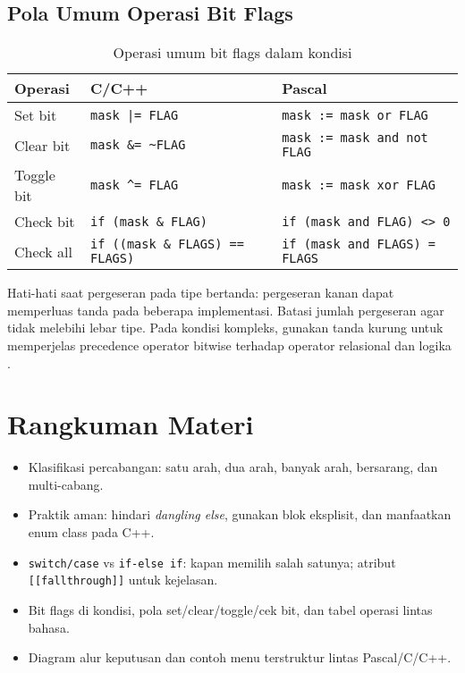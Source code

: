 \documentclass[../main.tex]{subfiles}
\begin{document}
\subsection{Pola Umum Operasi Bit Flags}
\begin{table}[H]
  \centering
  \caption{Operasi umum bit flags dalam kondisi}
  \begin{tabular}{@{}lll@{}}
    \toprule
    Operasi & C/C++ & Pascal \\
    \midrule
    Set bit & \texttt{mask |= FLAG} & \texttt{mask := mask or FLAG} \\
    Clear bit & \texttt{mask \&= \~{}FLAG} & \texttt{mask := mask and not FLAG} \\
    Toggle bit & \texttt{mask \^{}= FLAG} & \texttt{mask := mask xor FLAG} \\
    Check bit & \texttt{if (mask \& FLAG)} & \texttt{if (mask and FLAG) {\textless}{\textgreater} 0} \\
    Check all & \texttt{if ((mask \& FLAGS) == FLAGS)} & \texttt{if (mask and FLAGS) = FLAGS} \\
    \bottomrule
  \end{tabular}
\end{table}

Hati-hati saat pergeseran pada tipe bertanda: pergeseran kanan dapat memperluas tanda pada beberapa implementasi. Batasi jumlah pergeseran agar tidak melebihi lebar tipe. Pada kondisi kompleks, gunakan tanda kurung untuk memperjelas precedence operator bitwise terhadap operator relasional dan logika \parencite{iso-c-draft-n1570,cpp-reference}.

\section{Rangkuman Materi}
\begin{itemize}
  \item Klasifikasi percabangan: satu arah, dua arah, banyak arah, bersarang, dan multi-cabang.
  \item Praktik aman: hindari \emph{dangling else}, gunakan blok eksplisit, dan manfaatkan enum class pada C++.
  \item \texttt{switch/case} vs \texttt{if-else if}: kapan memilih salah satunya; atribut \texttt{[[fallthrough]]} untuk kejelasan.
  \item Bit flags di kondisi, pola set/clear/toggle/cek bit, dan tabel operasi lintas bahasa.
  \item Diagram alur keputusan dan contoh menu terstruktur lintas Pascal/C/C++.
\end{itemize}
\end{document}
